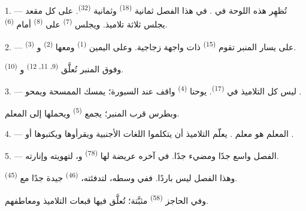 \VUsaut{2.0mm}
\VUsaut{3.2mm}
\VUsaut{2.6mm}
\VUsaut{3.4mm}
\VUornamento{9pt}
\VUsaut{5.0mm}
\VUsaut{3.0mm}
\VUfilet{16mm}
\VUsaut{5.6mm}

\VUsaut{1.4mm}
\VUsaut{2.2mm}
\VUfilet{20mm}
\VUsaut{6.4mm}

\VUsaut{3.0mm}

1. --- تُظهِر هذه اللوحة  في . في هذا الفصل
ثمانية  \textsuperscript{(18)} وثمانية 
\textsuperscript{(32)}. على كل مقعد يجلس ثلاثة تلاميذ. ويجلس 
\textsuperscript{(7)} على  \textsuperscript{(8)} أمام 
\textsuperscript{(6)}.

2. --- على يسار المنبر تقوم  \textsuperscript{(15)} ذات واجهة
زجاجية. وعلى اليمين  \textsuperscript{(1)} ومعها 
\textsuperscript{(2)} و \textsuperscript{(3)}.

وفوق المنبر تُعلَّق  \textsuperscript{(9, 11, 12)}
و \textsuperscript{(10)}.

3. --- ليس كل التلاميذ في  \textsuperscript{(17)}. يوحنا
\textsuperscript{(4)} واقف عند السبورة؛ يمسك الممسحة ويمحو .

وبطرس قرب المنبر؛ يجمع  \textsuperscript{(5)} ويحملها
إلى المعلم.

4. ---  المعلم هو معلم . يعلّم التلاميذ
أن يتكلموا اللغات الأجنبية ويقرأوها ويكتبوها  أو .

5. --- الفصل واسع جدًا ومضيء جدًا. في آخره  عريضة لها
 \textsuperscript{(78)} و، لتهويته وإنارته.

وهذا الفصل ليس باردًا. ففي وسطه، لتدفئته،  \textsuperscript{(46)}
جيدة جدًا مع  \textsuperscript{(45)}.

وفي الحاجز  \textsuperscript{(58)} مثبَّتة؛ تُعلَّق فيها قبعات
التلاميذ ومعاطفهم.

